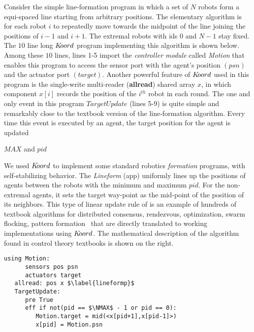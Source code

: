 Consider the simple line-formation program in which a set of $N$ robots form a equi-spaced line starting from arbitrary positions. The elementary algorithm is for each robot $i$ to repeatedly move towards the midpoint of the line joining the positions of $i-1$ and $i+1$. The extremal robots with ids $0$ and $N-1$ stay fixed. 
%
The $10$ line long  $K\kern-2pt oord$ program implementing this algorithm is shown below. Among these $10$ lines, lines 1-5 import the {\em controller module\/} called {\em Motion\/} that enables this program to access the sensor port with the agent's position $(\mathit{psn})$ and the actuator port $(\mathit{target})$. Another powerful feature of $K\kern-2pt oord$ used in this program is the single-write multi-reader ({\bf allread}) shared array $x$, in which component $x[i]$ records the position of the $i^{th}$ robot in each round. 
%
The one and only event in this program $\mathit{TargetUpdate}$ (lines 5-9) is quite simple and remarkably close to the textbook version of the line-formation algorithm. Every time this event is executed by an agent, the target position for the agent is updated 

$\mathit{MAX}$ and $\mathit{pid}$ 
 

We used $K\kern-2pt oord$ to implement some standard robotics \emph{formation} programs, with self-stabilizing behavior. The \emph{Lineform} (app) uniformly lines up the positions of  agents between the robots with the minimum and maximum $pid$. For the non-extremal agents, it sets the target way-point as the mid-point of the position of its neighbors. This type of linear update rule of is an example of hundreds of textbook algorithms for distributed consensus, rendezvous, optimization, swarm flocking, pattern formation~\cite{Tsitsiklis:1986,Blondel,Magnusbook2010} that are directly translated to working implementations using $K\kern-2pt oord$. The mathematical description of the algorithm found in control theory textbooks is shown on the right. 

 \belowcaptionskip=-10pt
\begin{lstlisting}[label=lineform,caption=Lineform Koord program]
   using Motion:
      sensors pos psn
      actuators target
   allread: pos x $\label{lineformp}$
   TargetUpdate:
      pre True
      eff if not(pid == $\NMAX$ - 1 or pid == 0):
         Motion.target = mid(<x[pid+1],x[pid-1]>)
         x[pid] = Motion.psn
\end{lstlisting}

 
